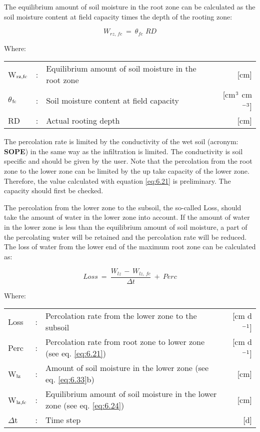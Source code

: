The equilibrium amount of soil moisture in the root zone can be calculated as the soil
moisture content at field capacity times the depth of the rooting zone:

\begin{equation}
\label{eq:6.22}
W _{rz,\, fc} ~=~ \theta  _{fc} \,\, RD
\end{equation}

Where:\\[5pt]
\begin{tabularx}{\textwidth}{llXr}
W$_{{\rm rz,fc}}$ &:& Equilibrium amount of soil moisture in the root zone  & [cm]\\
$\theta$$_{{\rm fc}}$ &:& Soil moisture content at field capacity  & 
    [cm$^{{\rm 3}}$ cm$^{{\rm -3}}$]\\
RD &:& Actual rooting depth  & [cm]\\
\end{tabularx}

The percolation rate is limited by the conductivity of the wet soil (acronym: {\bf SOPE}) in the
same way as the infiltration is limited. The conductivity is soil specific and should be
given by the user. Note that the percolation from the root zone to the lower zone can be
limited by the up take capacity of the lower zone. Therefore, the value calculated with 
equation \ref{eq:6.21} is preliminary. The capacity should first be checked.

The percolation from the lower zone to the subsoil, the so-called Loss, should take the
amount of water in the lower zone into account. If the amount of water in the lower zone
is less than the equilibrium amount of soil moisture, a part of the percolating water will
be retained and the percolation rate will be reduced. The loss of water from the lower end
of the maximum root zone can be calculated as:

\begin{equation}
\label{eq:6.23}
Loss ~=~{\frac{W _{lz} \, -\, W _{lz,\, fc} }{\Delta t}} ~+~ Perc
\end{equation}

Where:\\[5pt]
\begin{tabularx}{\textwidth}{llXr}
Loss &:& Percolation rate from the lower zone to the subsoil   & [cm d$^{{\rm -1}}$]\\
Perc &:& Percolation rate from root zone to lower zone (see eq. \ref{eq:6.21})  & [cm d$^{{\rm -1}}$]\\
W$_{{\rm lz}}$ &:& Amount of soil moisture in the lower zone (see eq. \ref{eq:6.33}b)  & [cm]\\
W$_{{\rm lz,fc}}$ &:& Equilibrium amount of soil moisture in the
   lower zone (see eq. \ref{eq:6.24})  & [cm]\\
$\Delta$t &:& Time step   & [d]\\
\end{tabularx}

